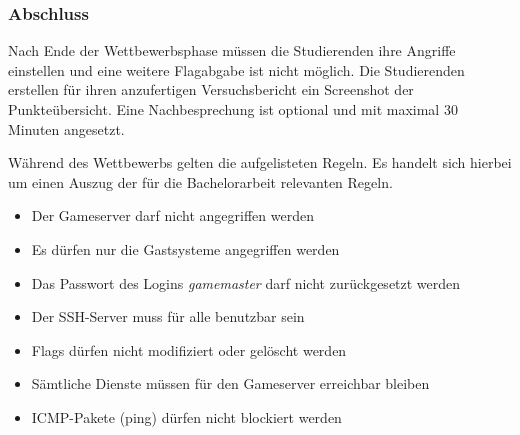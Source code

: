 \subsubsection{Abschluss}
Nach Ende der Wettbewerbsphase müssen die Studierenden ihre Angriffe einstellen und eine weitere Flagabgabe ist nicht möglich. Die Studierenden erstellen für ihren anzufertigen Versuchsbericht ein Screenshot der Punkteübersicht. Eine Nachbesprechung ist optional und mit maximal 30 Minuten angesetzt.

Während des Wettbewerbs gelten die aufgelisteten Regeln. Es handelt sich hierbei um einen Auszug der für die Bachelorarbeit relevanten Regeln.
\begin{itemize}
\item Der Gameserver darf nicht angegriffen werden
\item Es dürfen nur die Gastsysteme angegriffen werden
\item Das Passwort des Logins \textit{gamemaster} darf nicht zurückgesetzt werden
\item Der SSH-Server muss für alle benutzbar sein
\item Flags dürfen nicht modifiziert oder gelöscht werden
\item Sämtliche Dienste müssen für den Gameserver erreichbar bleiben
\item ICMP-Pakete (ping) dürfen nicht blockiert werden
\end{itemize} \cite[S.9]{quadePraktikumITSecurity2017}\cite[S.10-11]{sosnaKonzeptionUndRealisierung2010}